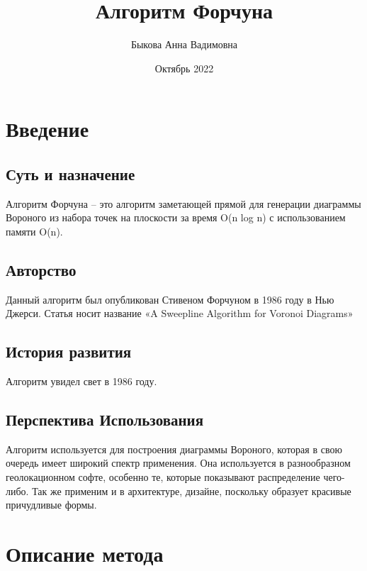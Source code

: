 \documentclass[12 pt, a4paper]{article}
\title{Алгоритм Форчуна}
\author{Быкова Анна Вадимовна}
\date{Октябрь 2022}
\begin{document}
\maketitle

\section{Введение}
\subsection{Суть и назначение}
Алгоритм Форчуна – это алгоритм заметающей прямой для генерации диаграммы Вороного из набора точек на плоскости за время O(n log n) с использованием памяти O(n).
\subsection{Авторство}
Данный алгоритм был опубликован Стивеном Форчуном в 1986 году в Нью Джерси. Статья носит название «A Sweepline Algorithm for Voronoi Diagrams» 
\subsection{История развития}
Алгоритм увидел свет в 1986 году.
\subsection{Перспектива Использования}
Алгоритм используется для построения диаграммы Вороного, которая в свою очередь имеет широкий спектр применения. 
Она используется в разнообразном геолокационном софте, особенно те, которые показывают распределение чего-либо. Так же применим и в архитектуре, дизайне, поскольку образует красивые причудливые формы. 
\newpage
\section{Описание метода}
\end{document}
